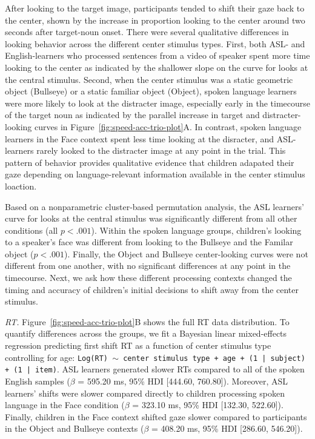 \documentclass[,man,floatsintext]{apa6}
\begin{document}
After looking to the target image, participants tended to shift their
gaze back to the center, shown by the increase in proportion looking to
the center around two seconds after target-noun onset. There were
several qualitative differences in looking behavior across the different
center stimulus types. First, both ASL- and English-learners who
processed sentences from a video of speaker spent more time looking to
the center as indicated by the shallower slope on the curve for looks at
the central stimulus. Second, when the center stimulus was a static
geometric object (Bullseye) or a static familiar object (Object), spoken
language learners were more likely to look at the distracter image,
especially early in the timecourse of the target noun as indicated by
the parallel increase in target and distracter-looking curves in
Figure~\ref{fig:speed-acc-trio-plot}A. In contrast, spoken language
learners in the Face context spent less time looking at the disracter,
and ASL-learners rarely looked to the distracter image at any point in
the trial. This pattern of behavior provides qualitative evidence that
children adapated their gaze depending on language-relevant information
available in the center stimulus loaction.

Based on a nonparametric cluster-based permutation analysis, the ASL
learners' curve for looks at the central stimulus was significantly
different from all other conditions (all \(p < .001\)). Within the
spoken language groups, children's looking to a speaker's face was
different from looking to the Bullseye and the Familar object
(\(p < .001\)). Finally, the Object and Bullseye center-looking curves
were not different from one another, with no significant differences at
any point in the timecourse. Next, we ask how these different processing
contexts changed the timing and accuracy of children's initial decisions
to shift away from the center stimulus.

\emph{RT.} Figure~\ref{fig:speed-acc-trio-plot}B shows the full RT data
distribution. To quantify differences across the groups, we fit a
Bayesian linear mixed-effects regression predicting first shift RT as a
function of center stimulus type controlling for age:
\texttt{Log(RT) $\sim$ center stimulus type + age +  (1 | subject) + (1 | item)}.
ASL learners generated slower RTs compared to all of the spoken English
samples (\(\beta\) = 595.20 ms, 95\% HDI {[}444.60, 760.80{]}).
Moreover, ASL learners' shifts were slower compared directly to children
processing spoken language in the Face condition (\(\beta\) = 323.10 ms,
95\% HDI {[}132.30, 522.60{]}). Finally, children in the Face context
shifted gaze slower compared to participants in the Object and Bullseye
contexts (\(\beta\) = 408.20 ms, 95\% HDI {[}286.60, 546.20{]}).
\end{document}
